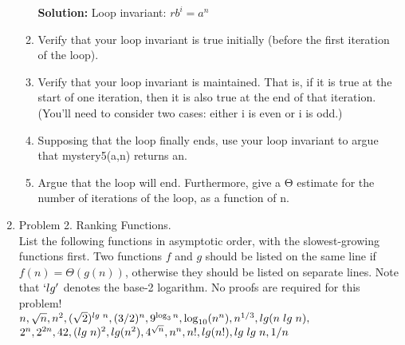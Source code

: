 \documentclass[11pt]{article}
\begin{document}
\begin{enumerate}
\begin{enumerate}
        \textbf{Solution:} Loop invariant: $rb^{i} = a^n$ \\
        
        \item Verify that your loop invariant is true initially (before the first iteration of the loop).
        

        \item Verify that your loop invariant is maintained. That is, if it is true at the start of one iteration, then it is also true at the end of that iteration. (You'll need to consider two cases: either i is even or i is odd.)

        \item Supposing that the loop finally ends, use your loop invariant to argue that mystery5(a,n) returns an.

        \item Argue that the loop will end. Furthermore, give a Θ estimate for the number of iterations of the loop, as a function of n.
    \end{enumerate}

\item Problem 2. Ranking Functions.\\
List the following functions in asymptotic order, with the slowest-growing functions first. Two functions $f$ and $g$ should be listed on the same line if $f(n)=Θ(g(n))$, otherwise they should be listed on separate lines. Note that $`lg'$ denotes the base-2 logarithm. No proofs are required for this problem!\\
\hspace{0.5cm}
$n, \sqrt{n}, n^2, (\sqrt2)^{lg \hspace{0.1 cm} n}, (3/2)^{n}, 9^{\log _{3} n}, \log _{10} (n^n), n^{1/3}, lg(n\hspace{0.1 cm} lg\hspace{0.1 cm}n),$ \\
$ 2^n, 2^{2n}, 42, (lg \hspace{0.1 cm}n)^2, lg (n^2), 4^{\sqrt{n}}, n^n, n!, lg(n!), lg \hspace{0.1cm}lg\hspace{0.1cm}n, 1/n$


\end{enumerate}
\end{document}

